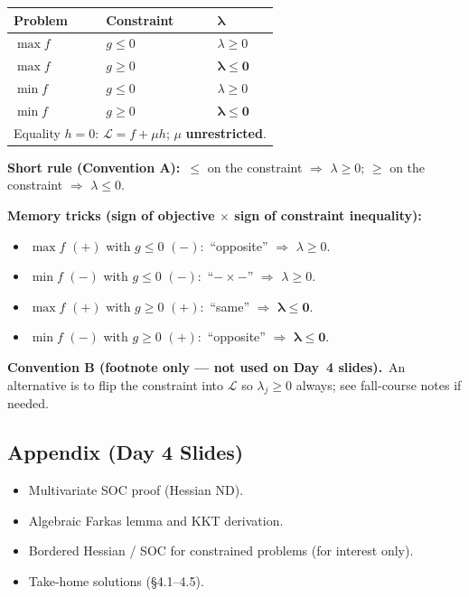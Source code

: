 \documentclass[11pt,a4paper]{article}
\begin{document}
\begin{center}
\small
\begin{tabular}{@{}lll@{}}
\toprule
\textbf{Problem} & \textbf{Constraint} & $\boldsymbol{\lambda}$ \\
\midrule
$\max f$ & $g\le 0$ & $\lambda\ge 0$ \\
$\max f$ & $g\ge 0$ & $\boldsymbol{\lambda\le 0}$ \\
$\min f$ & $g\le 0$ & $\lambda\ge 0$ \\
$\min f$ & $g\ge 0$ & $\boldsymbol{\lambda\le 0}$ \\
\midrule
\multicolumn{3}{l}{Equality $h=0$: $\mathcal{L}=f+\mu h$; $\mu$ \textbf{unrestricted}.} \\
\bottomrule
\end{tabular}
\end{center}

\noindent\textbf{Short rule (Convention A):}\ $\le$ on the constraint $\Rightarrow$ $\lambda\ge 0$;
$\ge$ on the constraint $\Rightarrow$ $\lambda\le 0$.

\medskip
\noindent\textbf{Memory tricks (sign of objective $\times$ sign of constraint inequality):}
\begin{itemize}[nosep,leftmargin=*]
  \item $\max f$ $(+)$ with $g\le 0$ $(-)$:\ ``opposite'' $\Rightarrow$ $\lambda\ge 0$.
  \item $\min f$ $(-)$ with $g\le 0$ $(-)$:\ ``$- \times -$'' $\Rightarrow$ $\lambda\ge 0$.
  \item $\max f$ $(+)$ with $g\ge 0$ $(+)$:\ ``same'' $\Rightarrow$ $\boldsymbol{\lambda\le 0}$.
  \item $\min f$ $(-)$ with $g\ge 0$ $(+)$:\ ``opposite'' $\Rightarrow$ $\boldsymbol{\lambda\le 0}$.
\end{itemize}

\medskip
\noindent\textbf{Convention B (footnote only --- not used on Day~4 slides).}\ An alternative is to flip
the constraint into $\mathcal{L}$ so $\lambda_j\ge 0$ always; see fall-course notes if needed.

\subsection{Appendix (Day 4 Slides)}
\begin{itemize}[leftmargin=*]
    \item Multivariate SOC proof (Hessian ND).
    \item Algebraic Farkas lemma and KKT derivation.
    \item Bordered Hessian / SOC for constrained problems (for interest only).
    \item Take-home solutions (§4.1--4.5).
\end{itemize}
\end{document}
